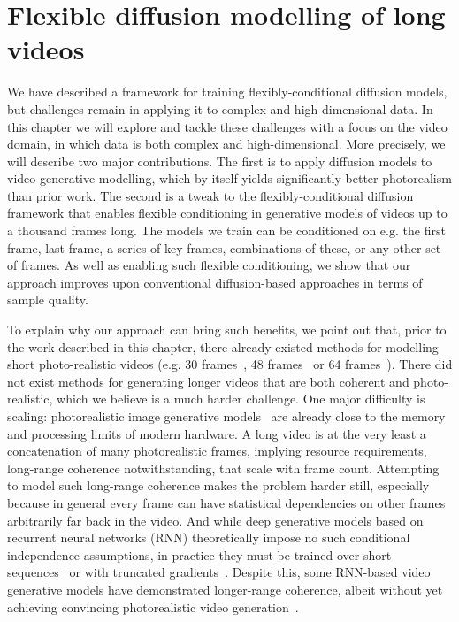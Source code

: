 \chapter{Flexible diffusion modelling of long videos}
\label{ch:fdm}

We have described a framework for training flexibly-conditional diffusion models, but challenges remain in applying it to complex and high-dimensional data. In this chapter we will explore and tackle these challenges with a focus on the video domain, in which data is both complex and high-dimensional. More precisely, we will describe two major contributions. The first is to apply diffusion models to video generative modelling, which by itself yields significantly better photorealism than prior work. The second is a tweak to the flexibly-conditional diffusion framework that enables flexible conditioning in generative models of videos up to a thousand frames long. The models we train can be conditioned on e.g. the first frame, last frame, a series of key frames, combinations of these, or any other set of frames. As well as enabling such flexible conditioning, we show that our approach improves upon conventional diffusion-based approaches in terms of sample quality.

To explain why our approach can bring such benefits, we point out that, prior to the work described in this chapter, there already existed methods for modelling short photo-realistic videos (e.g. 30 frames~\citep{weissenborn2019scaling}, 48 frames~\cite{clark2019adversarial} or 64 frames~\citep{ho2022video}). There did not exist methods for generating longer videos that are both coherent and photo-realistic, which we believe is a much harder challenge. One major difficulty is scaling: photorealistic image generative models~\citep{child2020very,dhariwal2021diffusion} are already close to the memory and processing limits of modern hardware.  A long video is at the very least a concatenation of many photorealistic frames, implying resource requirements, long-range coherence notwithstanding, that scale with frame count. Attempting to model such long-range coherence makes the problem harder still, especially because in general every frame can have statistical dependencies on other frames arbitrarily far back in the video. And while deep generative models based on recurrent neural networks (RNN) theoretically impose no such conditional independence assumptions, in practice they must be trained over short sequences~\cite{gruslys2016memory,saxena2021clockwork} or with truncated gradients~\citep{tallec2017unbiasing}.  Despite this, some RNN-based video generative models have demonstrated longer-range coherence, albeit without yet achieving convincing photorealistic video generation~\citep{saxena2021clockwork,babaeizadeh2021fitvid,denton2018stochastic,kim2019variational,babaeizadeh2017stochastic}.


